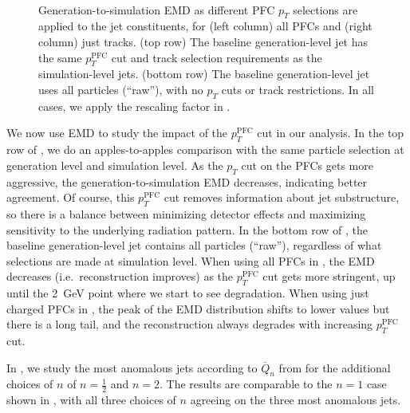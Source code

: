 \documentclass[aps,prd,twocolumn,preprintnumbers,nofootinbib,longbibliography,floatfix,superscriptaddress]{revtex4-1}
\begin{document}
\begin{figure*}
	\\
  \caption{  \label{fig:emdcmp_pT}
  Generation-to-simulation EMD as different PFC $p_T$ selections are applied to the jet constituents, for (left column) all PFCs and (right column) just tracks.
  (top row)  The baseline generation-level jet has the same $p_T^\text{PFC}$ cut and track selection requirements as the simulation-level jets.
  (bottom row)  The baseline generation-level jet uses all particles (``raw''), with no $p_T$ cuts or track restrictions.
  In all cases, we apply the rescaling factor in .
}
\end{figure*}


We now use EMD to study the impact of the $p_T^\text{PFC}$ cut in our analysis.
%
In the top row of , we do an apples-to-apples comparison with the same particle selection at generation level and simulation level.
%
As the $p_T$ cut on the PFCs gets more aggressive, the generation-to-simulation EMD decreases, indicating better agreement.
%
Of course, this $p_T^\text{PFC}$ cut removes information about jet substructure, so there is a balance between minimizing detector effects and maximizing sensitivity to the underlying radiation pattern.
%
In the bottom row of , the baseline generation-level jet contains all particles (``raw''), regardless of what selections are made at simulation level.
%
When using all PFCs in , the EMD decreases (i.e.~reconstruction improves) as the $p_T^\text{PFC}$ cut gets more stringent, up until the \SI{2}{GeV} point where we start to see degradation.
%
When using just charged PFCs in , the peak of the EMD distribution shifts to lower values but there is a long tail, and the reconstruction always degrades with increasing $p_T^\text{PFC}$ cut.


In , we study the most anomalous jets according to $\overline{Q}_n$ from  for the additional choices of $n$ of $n=\frac12$ and $n=2$.
%
The results are comparable to the $n=1$ case shown in , with all three choices of $n$ agreeing on the three most anomalous jets.
\end{document}
